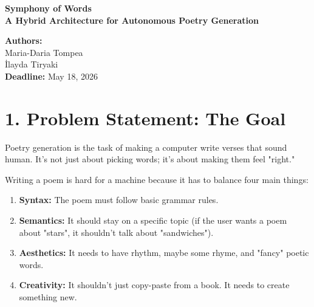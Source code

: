\documentclass[12pt, a4paper]{article}
\begin{document}
\begin{center}
    \vspace*{2cm}
    {\Huge \bfseries \color{primary} Symphony of Words} \\
    \vspace{0.5cm}
    {\Large \bfseries A Hybrid Architecture for Autonomous Poetry Generation} \\
    \vspace{1cm}
    \begin{tcolorbox}[colback=lightgray, colframe=accent, width=0.6\textwidth, center title]
        \centering
        \textbf{Authors:} \\
        Maria-Daria Tompea \\
        İlayda Tiryaki \\
        \vspace{0.2cm}
        \textbf{Deadline:} May 18, 2026
    \end{tcolorbox}
    \vspace{2cm}
\end{center}

\section{1. Problem Statement: The Goal}
\begin{tcolorbox}[title=What is Poetry Generation?]
Poetry generation is the task of making a computer write verses that sound human. It's not just about picking words; it's about making them feel "right."
\end{tcolorbox}

Writing a poem is hard for a machine because it has to balance four main things:
\begin{enumerate}
    \item \textbf{Syntax:} The poem must follow basic grammar rules.
    \item \textbf{Semantics:} It should stay on a specific topic (if the user wants a poem about "stars", it shouldn't talk about "sandwiches").
    \item \textbf{Aesthetics:} It needs to have rhythm, maybe some rhyme, and "fancy" poetic words.
    \item \textbf{Creativity:} It shouldn't just copy-paste from a book. It needs to create something new.
\end{enumerate}
\end{document}

